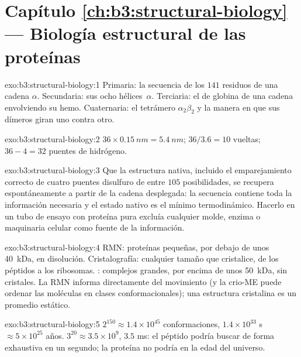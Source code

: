 \section*{Capítulo \ref{ch:b3:structural-biology} --- Biología estructural de las proteínas}

\begin{solution}{exo:b3:structural-biology:1}
Primaria: la secuencia de los $141$ residuos de una cadena $\alpha$.
Secundaria: sus ocho hélices~$\alpha$. Terciaria: el  de
globina de una cadena envolviendo su hemo. Cuaternaria: el tetrámero
$\alpha_{2}\beta_{2}$ y la manera en que sus dímeros giran uno contra
otro.
\end{solution}

\begin{solution}{exo:b3:structural-biology:2}
$36\times \qty{0.15}{nm} = \qty{5.4}{nm}$; $36/3.6 = 10$ vueltas;
$36 - 4 = 32$ puentes de hidrógeno.
\end{solution}

\begin{solution}{exo:b3:structural-biology:3}
Que la estructura nativa, incluido el emparejamiento correcto de cuatro
puentes disulfuro de entre $105$ posibilidades, se recupera
espontáneamente a partir de la cadena desplegada: la secuencia contiene
toda la información necesaria y el estado nativo es el mínimo
termodinámico. Hacerlo en un tubo de ensayo con proteína pura excluía
cualquier molde, enzima o maquinaria celular como fuente de la
información.
\end{solution}

\begin{solution}{exo:b3:structural-biology:4}
RMN: proteínas pequeñas, por debajo de unos \qty{40}{kDa}, en disolución.
Cristalografía: cualquier tamaño que cristalice, de los péptidos a los
ribosomas. : complejos grandes, por encima de
unos \qty{50}{kDa}, sin cristales. La RMN informa directamente del
movimiento (y la crio-ME puede ordenar las moléculas en clases
conformacionales); una estructura cristalina es un promedio estático.
\end{solution}

\begin{solution}{exo:b3:structural-biology:5}
$2^{150} \approx 1.4\times 10^{45}$ conformaciones, $1.4\times 10^{33}$
s $\approx 5\times 10^{25}$ años. $3^{20} \approx 3.5\times 10^{9}$,
$3.5$ ms: el péptido podría buscar de forma exhaustiva en un segundo; la
proteína no podría en la edad del universo.
\end{solution}

